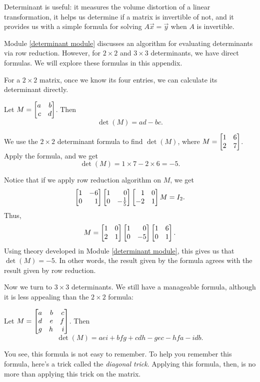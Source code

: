 Determinant is useful: it measures the volume distortion of a linear transformation,
it helps us determine if a matrix is invertible of not, and it provides us with a
simple formula for solving $A\vec x=\vec y$ when $A$ is invertible.

Module \ref{determinant module} discusses an algorithm for evaluating determinants
via row reduction. However, for $2\times 2$ and $3\times 3$ determinants, we
have direct formulas. We will explore these formulas in this appendix.

 For a $2\times 2$ matrix, once we
know its four entries, we can calculate its determinant directly.
\begin{theorem}
	Let $M=\mat{a & b \\ c & d}$. Then
	\[
		\det(M)=ad-bc.
	\]
\end{theorem}
\begin{example}
	We use the $2\times 2$ determinant formula to find $\det(M)$, where
	$M=\mat{1 & 6 \\ 2 & 7}$. Apply the formula, and we get
	\[
		\det(M)=1\times 7-2\times 6=-5.
	\]
\end{example}
Notice that if we apply row reduction algorithm on $M$, we get
\[
	\mat{1 & -6 \\ 0 & 1}\mat{1 & 0 \\ 0 & -\frac{1}{5}}\mat{1 & 0 \\ -2 & 1}M=I_{2}.
\]
Thus,
\[
	M=\mat{1 & 0 \\ 2 & 1}\mat{1 & 0 \\ 0 & -5}\mat{1 & 6 \\ 0 & 1}.
\]
Using theory developed in Module \ref{determinant module}, this gives us that
$\det(M)=-5$. In other words, the result given by the formula agrees with the
result given by row reduction.

 Now we turn
to $3\times 3$ determinants. We still have a manageable formula, although it is less
appealing than the $2\times 2$ formula:
\begin{theorem}
	Let $M=\mat{a & b & c \\ d & e & f \\ g & h & i}$. Then
	\[
		\det(M)=aei+bfg+cdh-gec-hfa-idb.
	\]
\end{theorem}
You see, this formula is not easy to remember. To help you remember this formula,
here's a trick called the \textit{diagonal trick}. Applying this formula, then, is
no more than applying this trick on the matrix.

